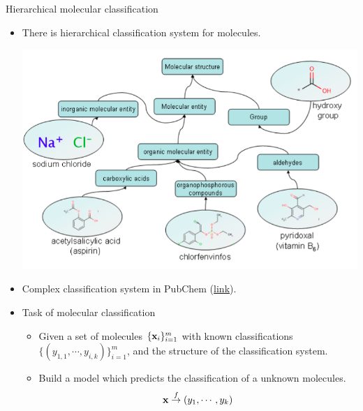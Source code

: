 \documentclass[first=dgreen,second=purple,logo=yellowexc]{aaltoslides}
\begin{document}
{\begin{frame}{Hierarchical molecular classification}
	\begin{itemize}
		\item There is hierarchical classification system for molecules.
		\begin{center}
			\includegraphics[scale=0.2]{./figures/classificationhierarchy.png}
		\end{center}
		\item Complex classification system in PubChem (\href{https://pubchem.ncbi.nlm.nih.gov/classification/\#hid=2\&cid=1\&view=tree}{link}).
		\item Task of molecular classification
		\begin{itemize}
			\footnotesize
			\item Given a set of molecules $\{\mathbf {x}_i\}_{i=1}^m$ with known classifications $\{(y_{1,1},\cdots,y_{i,k})\}_{i=1}^m$, and the structure of the classification system.
			\item Build a model which predicts the classification of a unknown molecules.
			\begin{align*}
				\mathbf {x} \overset{f}{\rightarrow} (y_{1},\cdots,y_{k})
			\end{align*}
		\end{itemize}
	\end{itemize}
\end{frame}

}
\end{document}
